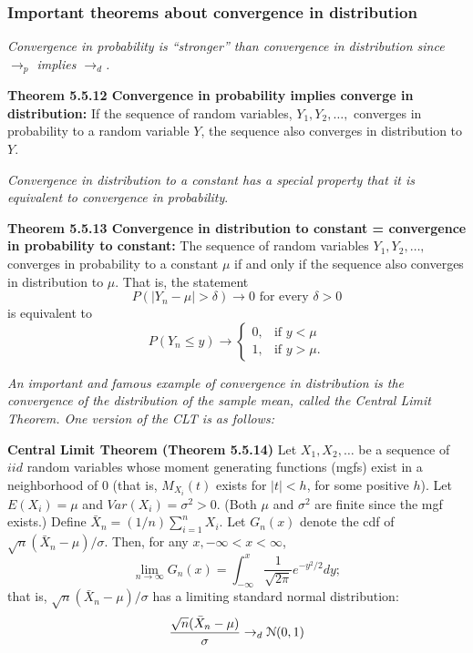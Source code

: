 \documentclass[11pt,]{article}
\def\Xbar{\bar{ X}}
\def\Nsc{{\cal N}}
\def\sumin{\sum_{i=1}^n}
\begin{document}
\hypertarget{important-theorems-about-convergence-in-distribution}{%
\subsubsection{Important theorems about convergence in
distribution}\label{important-theorems-about-convergence-in-distribution}}

\emph{Convergence in probability is ``stronger'' than convergence in
distribution since \(\to_p\) implies \(\to_d\).}

\textbf{Theorem 5.5.12 Convergence in probability implies converge in
distribution:} If the sequence of random variables,
\(Y_1, Y_2, \ldots,\) converges in probability to a random variable
\(Y\), the sequence also converges in distribution to \(Y\).

\emph{Convergence in distribution to a constant has a special property
that it is equivalent to convergence in probability}.

\textbf{Theorem 5.5.13 Convergence in distribution to constant =
convergence in probability to constant:} The sequence of random
variables \(Y_1, Y_2, \ldots,\) converges in probability to a constant
\(\mu\) if and only if the sequence also converges in distribution to
\(\mu.\) That is, the statement
\[P(| Y_n - \mu| > \delta) \to 0 \mbox{ for every } \delta > 0\] is
equivalent to \[P(Y_n \leq y) \to \begin{cases}
0, & \mbox{if } y< \mu\\
1, & \mbox{if } y> \mu.
\end{cases}
\]

\emph{An important and famous example of convergence in distribution is
the convergence of the distribution of the sample mean, called the
Central Limit Theorem. One version of the CLT is as follows:}

\noindent\textbf{Central Limit Theorem (Theorem 5.5.14)} Let
\(X_1, X_2, \ldots\) be a sequence of \(iid\) random variables whose
moment generating functions (mgfs) exist in a neighborhood of 0 (that
is, \(M_{X_i}(t)\) exists for \(|t| < h\), for some positive \(h\)). Let
\(E(X_i) =\mu\) and \(Var(X_i) = \sigma^2 > 0\). (Both \(\mu\) and
\(\sigma^2\) are finite since the mgf exists.) Define
\(\Xbar_n = (1/n) \sumin X_i\). Let \(G_n(x)\) denote the cdf of
\(\sqrt{n} (\Xbar_n - \mu)/\sigma\). Then, for any
\(x, -\infty < x < \infty\),
\[\lim_{n\to\infty} G_n(x) = \int_{-\infty}^{x} \frac{1}{\sqrt{2\pi}} e^{-y^2/2} dy;\]
that is, \(\sqrt{n}(\Xbar_n - \mu)/\sigma\) has a limiting standard
normal distribution:
\[\frac{\sqrt{n}(\Xbar_n - \mu)}{\sigma} \to_d \Nsc(0,1)\]
\end{document}
